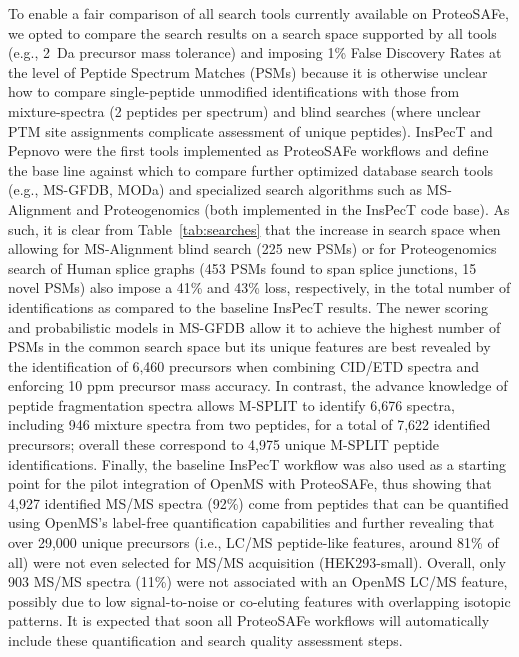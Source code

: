 \documentclass[arial,11pt]{article}
\newcommand{\SF}[1]{\textsf{#1}}
\newcommand{\SYSTEM}[0]{\SF{ProteoSAFe}\xspace}
\begin{document}
To enable a fair comparison of all search tools currently available on \SYSTEM, we opted to compare the search results on a search space supported by all tools (e.g., 2~Da precursor mass tolerance) and imposing 1\% False Discovery Rates at the level of Peptide Spectrum Matches (PSMs) because it is otherwise unclear how to compare single-peptide unmodified identifications with those from mixture-spectra (2 peptides per spectrum) and blind searches (where unclear PTM site assignments complicate assessment of unique peptides). InsPecT and Pepnovo were the first tools implemented as \SYSTEM workflows and define the base line against which to compare further optimized database search tools (e.g., MS-GFDB, MODa) and specialized search algorithms such as MS-Alignment and Proteogenomics (both implemented in the InsPecT code base). As such, it is clear from Table~\ref{tab:searches} that the increase in search space when allowing for MS-Alignment blind search (225 new PSMs) or for Proteogenomics search of Human splice graphs (453 PSMs found to span splice junctions, 15 novel PSMs) also impose a 41\% and 43\% loss, respectively, in the total number of identifications as compared to the baseline InsPecT results. The newer scoring and probabilistic models in MS-GFDB allow it to achieve the highest number of PSMs in the common search space but its unique features are best revealed by the identification of 6,460 precursors when combining CID/ETD spectra and enforcing 10 ppm precursor mass accuracy. In contrast, the advance knowledge of peptide fragmentation spectra allows M-SPLIT to identify 6,676 spectra, including 946 mixture spectra from two peptides, for a total of 7,622 identified precursors; overall these correspond to 4,975 unique M-SPLIT peptide identifications.
%
Finally, the baseline InsPecT workflow was also used as a starting point for the pilot integration of OpenMS with \SYSTEM, thus showing that 4,927 identified MS/MS spectra (92\%) come from peptides that can be quantified using OpenMS's label-free quantification capabilities and further revealing that over 29,000 unique precursors (i.e., LC/MS peptide-like features, around 81\% of all) were not even selected for MS/MS acquisition (HEK293-small). Overall, only 903 MS/MS spectra (11\%) were not associated with an OpenMS LC/MS feature, possibly due to low signal-to-noise or co-eluting features with overlapping isotopic patterns.
It is expected that soon all \SYSTEM workflows will automatically include these quantification and search quality assessment steps.
\end{document}
